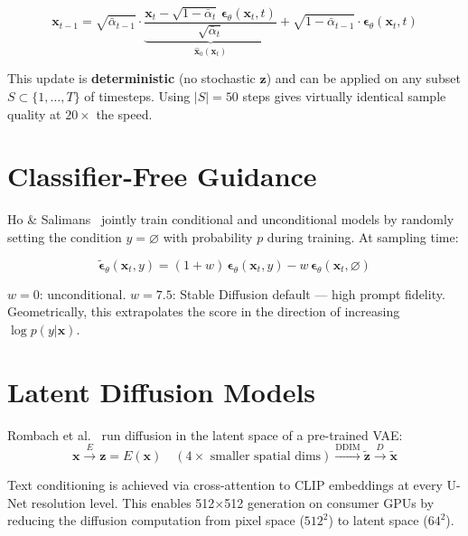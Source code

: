 \documentclass[11pt, a4paper]{article}
\theoremstyle{definition}
\newcommand{\bx}{\bm{x}}
\newcommand{\bepsilon}{\bm{\epsilon}}
\newcommand{\abar}{\bar{\alpha}}
\begin{document}
\begin{equation}
  \bx_{t-1} = \sqrt{\abar_{t-1}} \cdot \underbrace{\frac{\bx_t - \sqrt{1-\abar_t}\,\bepsilon_\theta(\bx_t, t)}{\sqrt{\abar_t}}}_{\hat{\bx}_0(\bx_t)} + \sqrt{1-\abar_{t-1}} \cdot \bepsilon_\theta(\bx_t, t)
  \label{eq:ddim}
\end{equation}

This update is \textbf{deterministic} (no stochastic $\bm{z}$) and can be applied on any
subset $S \subset \{1,\ldots,T\}$ of timesteps. Using $|S|=50$ steps gives virtually
identical sample quality at $20\times$ the speed.

\section{Classifier-Free Guidance}

Ho \& Salimans~\cite{ho2021cfg} jointly train conditional and unconditional models by randomly
setting the condition $y = \varnothing$ with probability $p$ during training. At sampling time:

\begin{equation}
  \tilde{\bepsilon}_\theta(\bx_t, y) = (1+w)\,\bepsilon_\theta(\bx_t, y) -
  w\,\bepsilon_\theta(\bx_t, \varnothing)
\end{equation}

$w=0$: unconditional. $w=7.5$: Stable Diffusion default — high prompt fidelity.
Geometrically, this extrapolates the score in the direction of increasing $\log p(y|\bx)$.

\section{Latent Diffusion Models}

Rombach et al.~\cite{rombach2022ldm} run diffusion in the latent space of a pre-trained VAE:
\begin{equation}
  \bx \xrightarrow{E} \bm{z} = E(\bx) \quad (\text{4}{\times}\text{ smaller spatial dims})
  \xrightarrow{\mathrm{DDIM}} \tilde{\bm{z}} \xrightarrow{D} \tilde{\bx}
\end{equation}

Text conditioning is achieved via cross-attention to CLIP embeddings at every U-Net resolution
level. This enables 512$\times$512 generation on consumer GPUs by reducing the diffusion
computation from pixel space ($512^2$) to latent space ($64^2$).
\end{document}
